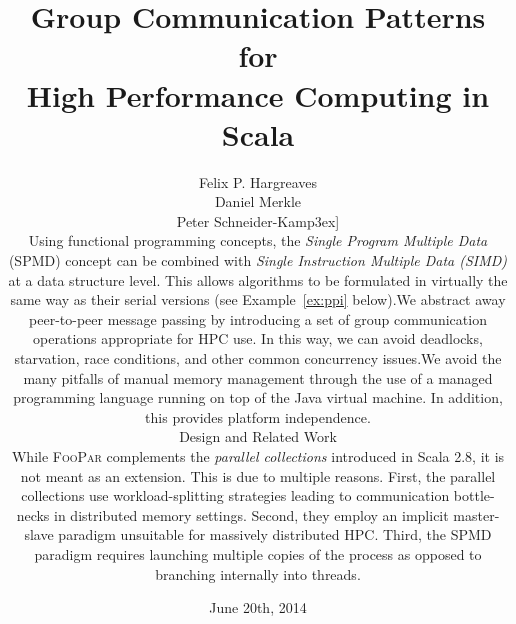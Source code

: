 \documentclass{article}
\date{June 20th, 2014}
\newcommand{\framework}{{\rmfamily\scshape FooPar}\xspace}
\begin{document}
\title{Group Communication Patterns for \\High Performance Computing in Scala}

\author{Felix P. Hargreaves\\ Daniel Merkle \\ Peter Schneider-Kamp\-3ex]
\begin{itemize}
\item Using functional programming concepts, the \emph{Single Program Multiple Data} (SPMD) \cite{spmd} concept can be combined with \emph{Single Instruction Multiple Data (SIMD)} at a data structure level. This allows algorithms to be
formulated in virtually the same way as their serial versions (see Example~\ref{ex:ppi} below).
\item We abstract away peer-to-peer message passing by introducing a set of group communication operations appropriate for HPC use. In this way, we can avoid deadlocks, starvation, race conditions, and other common concurrency issues.
\item We avoid the many pitfalls of manual memory management through the use of a managed programming language running on top of the Java virtual machine. In addition, this provides platform independence.
\end{itemize}

\subsection{Design and Related Work}
While \framework complements the \emph{parallel collections} \cite{odersky11} introduced in Scala
2.8, it is not meant as an extension. This is due to multiple reasons. First,
the parallel collections use workload-splitting strategies leading to communication bottle-necks in distributed memory settings.
Second, they employ an implicit master-slave paradigm unsuitable for massively distributed HPC. Third,
the SPMD paradigm requires launching multiple copies of the process as opposed to branching internally into threads.

}
\end{document}
